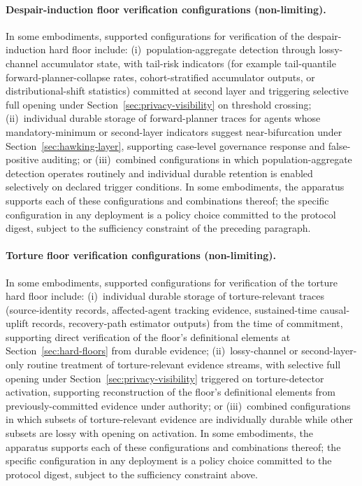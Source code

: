 \documentclass[a4paper,12pt]{article}
\begin{document}
\paragraph{Despair-induction floor verification configurations
(non-limiting).}
In some embodiments, supported configurations for verification of
the despair-induction hard floor include: (i)~population-aggregate
detection through lossy-channel accumulator state, with tail-risk
indicators (for example tail-quantile forward-planner-collapse rates,
cohort-stratified accumulator outputs, or distributional-shift
statistics) committed at second layer and triggering selective full
opening under Section~\ref{sec:privacy-visibility} on threshold
crossing; (ii)~individual durable storage of forward-planner traces
for agents whose mandatory-minimum or second-layer indicators
suggest near-bifurcation under
Section~\ref{sec:hawking-layer}, supporting case-level governance
response and false-positive auditing; or (iii)~combined
configurations in which population-aggregate detection operates
routinely and individual durable retention is enabled selectively on
declared trigger conditions. In some embodiments, the apparatus
supports each of these configurations and combinations thereof; the
specific configuration in any deployment is a policy choice
committed to the protocol digest, subject to the sufficiency
constraint of the preceding paragraph.

\paragraph{Torture floor verification configurations (non-limiting).}
In some embodiments, supported configurations for verification of
the torture hard floor include: (i)~individual durable storage of
torture-relevant traces (source-identity records, affected-agent
tracking evidence, sustained-time causal-uplift records, recovery-path
estimator outputs) from the time of commitment, supporting direct
verification of the floor's definitional elements at
Section~\ref{sec:hard-floors} from durable evidence; (ii)~lossy-channel
or second-layer-only routine treatment of torture-relevant evidence
streams, with selective full opening under
Section~\ref{sec:privacy-visibility} triggered on torture-detector
activation, supporting reconstruction of the floor's definitional
elements from previously-committed evidence under authority; or
(iii)~combined configurations in which subsets of torture-relevant
evidence are individually durable while other subsets are lossy with
opening on activation. In some embodiments, the apparatus supports
each of these configurations and combinations thereof; the specific
configuration in any deployment is a policy choice committed to the
protocol digest, subject to the sufficiency constraint above.
\end{document}
